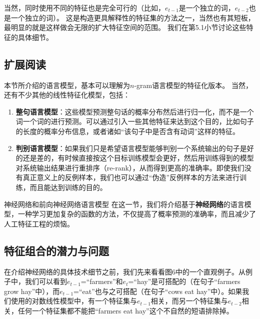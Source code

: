 \documentclass[10pt,a4paper]{ctexart}
\makeatletter
\renewcommand{\section}{\@startsection{section}{1}{0mm}
  {-\baselineskip}{0.5\baselineskip}{\bf\leftline}}
\makeatother
\begin{document}
当然，同时使用不同的特征也是完全可行的（比如，$e_{t-1}$是一个独立的词，$e_{t-2}$也是一个独立的词）。
这是构造更具解释性的特征集的方法之一，当然也有其短板，最明显的就是这样做会无限的扩大特征空间的范围。
我们在第5.1小节讨论这些特征的具体细节。

\subsection{扩展阅读}
本节所介绍的语言模型，基本可以理解为$n$-gram语言模型的特征化版本。
当然，还有不少其他的线性特征化模型，包括：
\begin{enumerate}
\item[] \textbf{整句语言模型}：这些模型预测整句话的概率分布然后进行归一化\cite{rosenfeld2001whole}，而不是一个词一个词的进行预测。可以通过引入一些其他特征来达到这个目的，比如句子的长度的概率分布信息，或者诸如“该句子中是否含有动词”这样的特征。
\item[] \textbf{判别语言模型}：如果我们只是希望语言模型能够判别一个系统输出的句子是好的还是差的，有时候直接按这个目标训练模型会更好，然后用训练得到的模型对系统输出结果进行重排序（re-rank），从而得到更高的准确率\cite{roark2004discriminative}。即使我们没有真正意义上的反例样本，我们也可以通过“伪造”反例样本的方法来进行训练，而且能达到训练的目的\cite{tsujiiythu2007discriminative}。
\end{enumerate}


\section{神经网络和前向神经网络语言模型}
在这一节，我们将介绍基于\textbf{神经网络}的语言模型，一种学习更加复杂的函数的方法，不仅提高了概率预测的准确率，而且减少了人工特征工程的烦恼。

\subsection{特征组合的潜力与问题}
在介绍神经网络的具体技术细节之前，我们先来看看图6中的一个直观例子。从例子中，我们可以看到$e_{t-1}$=“farmers”和$e_t$=“hay”是可搭配的（在句子“farmers grow hay”中），而$e_{t-1}$=“eat”也与之可搭配（在句子“cows eat hay”中）。如果我们使用的对数线性模型中，有一个特征集与$e_{t-1}$相关，而另一个特征集与$e_{t-2}$相关，任何一个特征集都不能把“farmers eat hay”这个不自然的短语排除掉。
\end{document}
